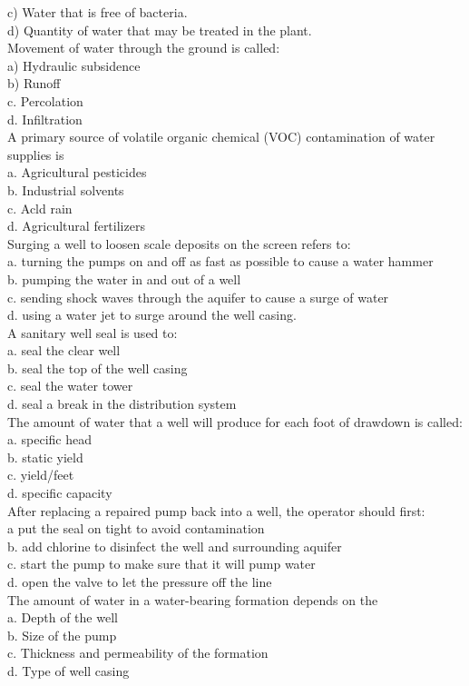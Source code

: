 c) Water that is free of bacteria.\\
d) Quantity of water that may be treated in the plant.\\
Movement of water through the ground is called:\\
a) Hydraulic subsidence\\
b) Runoff\\
c. Percolation\\
d. Infiltration\\
A primary source of volatile organic chemical (VOC) contamination of water supplies is\\
a. Agricultural pesticides\\
b. Industrial solvents\\
c. Acld rain\\
d. Agricultural fertilizers\\
Surging a well to loosen scale deposits on the screen refers to:\\
a. turning the pumps on and off as fast as possible to cause a water hammer\\
b. pumping the water in and out of a well\\
c. sending shock waves through the aquifer to cause a surge of water\\
d. using a water jet to surge around the well casing.\\
A sanitary well seal is used to:\\
a. seal the clear well\\
b. seal the top of the well casing\\
c. seal the water tower\\
d. seal a break in the distribution system\\
The amount of water that a well will produce for each foot of drawdown is called:\\
a. specific head\\
b. static yield\\
c. yield/feet\\
d. specific capacity\\
After replacing a repaired pump back into a well, the operator should first:\\
a put the seal on tight to avoid contamination\\
b. add chlorine to disinfect the well and surrounding aquifer\\
c. start the pump to make sure that it will pump water\\
d. open the valve to let the pressure off the line \\
The amount of water in a water-bearing formation depends on the\\
a. Depth of the well\\
b. Size of the pump\\
c. Thickness and permeability of the formation\\
d. Type of well casing\\

